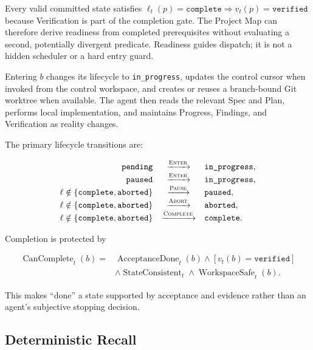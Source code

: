 \documentclass[11pt]{article}
\theoremstyle{definition}
\begin{document}
Every valid committed state satisfies
$\ell_t(p)=\texttt{complete}\Rightarrow v_t(p)=\texttt{verified}$ because
Verification is part of the completion gate.  The Project Map can therefore
derive readiness from completed prerequisites without evaluating a second,
potentially divergent predicate.  Readiness guides dispatch; it is not a hidden
scheduler or a hard entry guard.

Entering $b$ changes its lifecycle to \texttt{in\_progress}, updates the control
cursor when invoked from the control workspace, and creates or reuses a
branch-bound Git worktree when available.  The agent then reads the relevant
Spec and Plan, performs local implementation, and maintains Progress, Findings,
and Verification as reality changes.

The primary lifecycle transitions are:

\begin{equation}
\begin{array}{rcl}
\texttt{pending} &\xrightarrow{\textsc{Enter}}&
\texttt{in\_progress},\\
\texttt{paused} &\xrightarrow{\textsc{Enter}}&
\texttt{in\_progress},\\
\ell\notin\{\texttt{complete},\texttt{aborted}\}
&\xrightarrow{\textsc{Pause}}&
\texttt{paused},\\
\ell\notin\{\texttt{complete},\texttt{aborted}\}
&\xrightarrow{\textsc{Abort}}&
\texttt{aborted},\\
\ell\notin\{\texttt{complete},\texttt{aborted}\}
&\xrightarrow{\textsc{Complete}}&
\texttt{complete}.
\end{array}
\label{eq:lifecycle}
\end{equation}

Completion is protected by

\begin{equation}
\begin{aligned}
  \operatorname{CanComplete}_t(b)
  ={}&
  \operatorname{AcceptanceDone}_t(b)
  \land [v_t(b)=\texttt{verified}]\\
  &\land \operatorname{StateConsistent}_t
  \land \operatorname{WorkspaceSafe}_t(b).
\end{aligned}
  \label{eq:completion-gate}
\end{equation}

This makes ``done'' a state supported by acceptance and evidence rather than an
agent's subjective stopping decision.

\subsection{Deterministic Recall}
\end{document}
